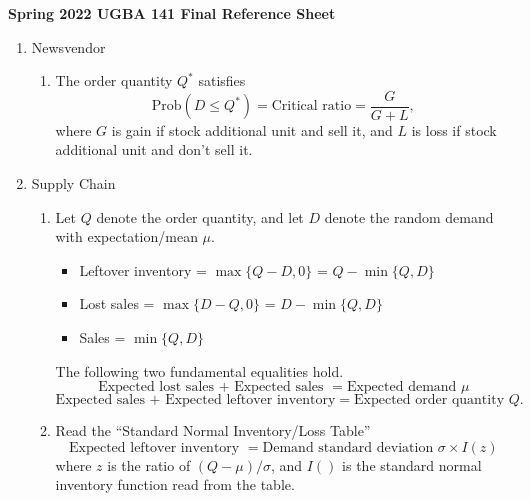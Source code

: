 \documentclass[twoside, 12pt]{article}
\newcommand{\lecture}[4]{
}
\begin{document}



\begin{center}
	{\bf \large Spring 2022 UGBA 141 Final Reference Sheet}
\end{center}

\begin{enumerate}
	\item Newsvendor
	\begin{enumerate}
		\item  	The order quantity $Q^*$ satisfies
		\[
		\text{Prob} (D \leq Q^*) = 	\text{Critical ratio} = \frac{G}{G+L},
		\]
		where $G$ is gain if stock additional unit and sell it, and $L$ is loss if stock additional unit and don’t sell it.
		\end{enumerate}
	\item Supply Chain
\begin{enumerate}
	\item Let $Q$ denote the order quantity, and let $D$ denote the random demand with expectation/mean $\mu$.
	\begin{itemize}
		\item Leftover inventory = $\max\{Q-D, 0\}$ = $Q- \min\{Q,D\}$
		\item Lost sales  = $\max\{D-Q, 0\}$ =  $D- \min\{Q,D\}$
		\item Sales  = $\min\{Q,D\}$
	\end{itemize}
	
	The following two fundamental equalities hold.
	\[
	\text{Expected lost sales + Expected sales } = \text{Expected demand } \mu
	\]
	\[
	\text{Expected sales + Expected leftover inventory} = \text{Expected order quantity } Q.
	\]
	
	\item Read the ``Standard Normal Inventory/Loss Table''
	\[
	\text{Expected leftover inventory }= \text{Demand standard deviation } \sigma \times  I(z)
	\]
	where $z$ is the ratio of $(Q-\mu)/\sigma$, and $I()$ is the standard normal inventory function read from the table. 
	

\end{enumerate}
\end{enumerate}
\end{document}
